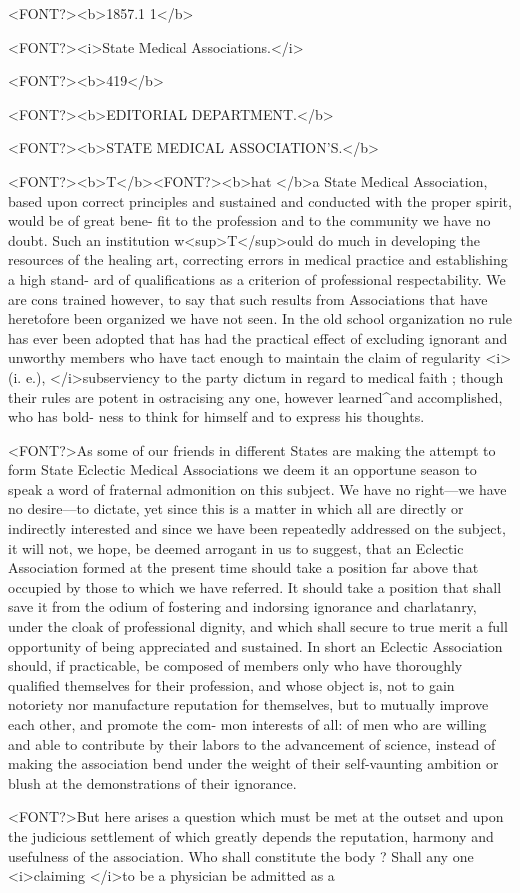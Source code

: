 <FONT?><b>1857.1 1</b>

<FONT?><i>State Medical Associations.</i>

<FONT?><b>419</b>

<FONT?><b>EDITORIAL DEPARTMENT.</b>

<FONT?><b>STATE MEDICAL ASSOCIATION'S.</b>

<FONT?><b>T</b><FONT?><b>hat </b>a State Medical Association, based upon correct principles and
sustained and conducted with the proper spirit, would be of great bene-
fit to the profession and to the community we have no doubt. Such an
institution w<sup>T</sup>ould do much in developing the resources of the healing
art, correcting errors in medical practice and establishing a high stand-
ard of qualifications as a criterion of professional respectability. We
are cons trained however, to say that such results from Associations that
have heretofore been organized we have not seen. In the old school
organization no rule has ever been adopted that has had the practical
effect of excluding ignorant and unworthy members who have tact
enough to maintain the claim of regularity <i>(i. e.), </i>subserviency to the
party dictum in regard to medical faith ; though their rules are potent
in ostracising any one, however learned^and accomplished, who has bold-
ness to think for himself and to express his thoughts.

<FONT?>As some of our friends in different States are making the attempt to
form State Eclectic Medical Associations we deem it an opportune
season to speak a word of fraternal admonition on this subject. We
have no right---we have no desire---to dictate, yet since this is a matter
in which all are directly or indirectly interested and since we have been
repeatedly addressed on the subject, it will not, we hope, be deemed
arrogant in us to suggest, that an Eclectic Association formed at the
present time should take a position far above that occupied by those
to which we have referred. It should take a position that shall save
it from the odium of fostering and indorsing ignorance and charlatanry,
under the cloak of professional dignity, and which shall secure to true
merit a full opportunity of being appreciated and sustained. In short
an Eclectic Association should, if practicable, be composed of members
only who have thoroughly qualified themselves for their profession, and
whose object is, not to gain notoriety nor manufacture reputation for
themselves, but to mutually improve each other, and promote the com-
mon interests of all: of men who are willing and able to contribute by
their labors to the advancement of science, instead of making the
association bend under the weight of their self-vaunting ambition or
blush at the demonstrations of their ignorance.

<FONT?>But here arises a question which must be met at the outset and
upon the judicious settlement of which greatly depends the reputation,
harmony and usefulness of the association. Who shall constitute the
body ?  Shall any one <i>claiming </i>to be a physician be admitted as a\endinput
